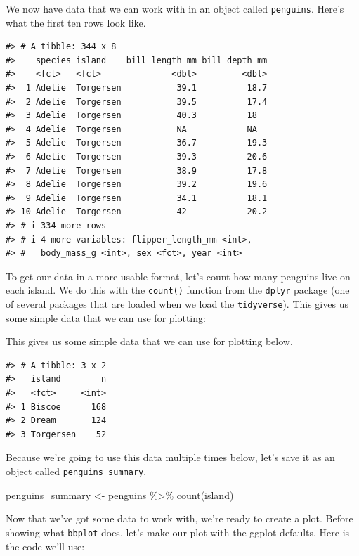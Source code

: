 \documentclass[
]{book}
\newenvironment{Shaded}{\begin{snugshade}}{\end{snugshade}}
\newcommand{\FunctionTok}[1]{\textcolor[rgb]{0.00,0.00,0.00}{#1}}
\newcommand{\NormalTok}[1]{#1}
\newcommand{\OtherTok}[1]{\textcolor[rgb]{0.56,0.35,0.01}{#1}}
\newcommand{\SpecialCharTok}[1]{\textcolor[rgb]{0.00,0.00,0.00}{#1}}
\begin{document}
We now have data that we can work with in an object called \texttt{penguins}. Here's what the first ten rows look like.

\begin{verbatim}
#> # A tibble: 344 x 8
#>    species island    bill_length_mm bill_depth_mm
#>    <fct>   <fct>              <dbl>         <dbl>
#>  1 Adelie  Torgersen           39.1          18.7
#>  2 Adelie  Torgersen           39.5          17.4
#>  3 Adelie  Torgersen           40.3          18  
#>  4 Adelie  Torgersen           NA            NA  
#>  5 Adelie  Torgersen           36.7          19.3
#>  6 Adelie  Torgersen           39.3          20.6
#>  7 Adelie  Torgersen           38.9          17.8
#>  8 Adelie  Torgersen           39.2          19.6
#>  9 Adelie  Torgersen           34.1          18.1
#> 10 Adelie  Torgersen           42            20.2
#> # i 334 more rows
#> # i 4 more variables: flipper_length_mm <int>,
#> #   body_mass_g <int>, sex <fct>, year <int>
\end{verbatim}

To get our data in a more usable format, let's count how many penguins live on each island. We do this with the \texttt{count()} function from the \texttt{dplyr} package (one of several packages that are loaded when we load the \texttt{tidyverse}). This gives us some simple data that we can use for plotting:

This gives us some simple data that we can use for plotting below.

\begin{verbatim}
#> # A tibble: 3 x 2
#>   island        n
#>   <fct>     <int>
#> 1 Biscoe      168
#> 2 Dream       124
#> 3 Torgersen    52
\end{verbatim}

Because we're going to use this data multiple times below, let's save it as an object called \texttt{penguins\_summary}.

\begin{Shaded}
\begin{Highlighting}[]
\NormalTok{penguins\_summary }\OtherTok{\textless{}{-}}\NormalTok{ penguins }\SpecialCharTok{\%\textgreater{}\%}
  \FunctionTok{count}\NormalTok{(island)}
\end{Highlighting}
\end{Shaded}

Now that we've got some data to work with, we're ready to create a plot. Before showing what \texttt{bbplot} does, let's make our plot with the ggplot defaults. Here is the code we'll use:
\end{document}
